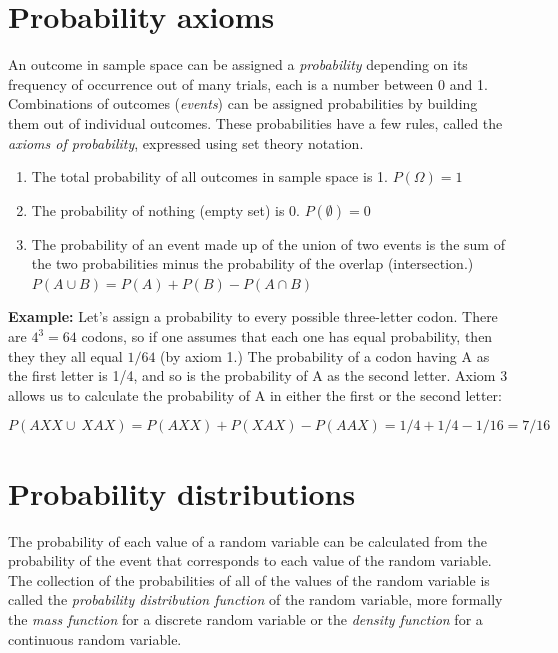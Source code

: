 \documentclass[
  letterpaper,
  DIV=11,
  numbers=noendperiod]{scrreprt}
\begin{document}
\hypertarget{probability-axioms}{%
\section{Probability axioms}\label{probability-axioms}}

An outcome in sample space can be assigned a \emph{probability}
depending on its frequency of occurrence out of many trials, each is a
number between 0 and 1. Combinations of outcomes (\emph{events}) can be
assigned probabilities by building them out of individual outcomes.
These probabilities have a few rules, called the \emph{axioms of
probability}, expressed using set theory notation.

\begin{enumerate}
\def\labelenumi{\arabic{enumi}.}
\item
  The total probability of all outcomes in sample space is 1.
  \(P(\Omega) = 1\)
\item
  The probability of nothing (empty set) is 0. \(P(\emptyset) = 0\)
\item
  The probability of an event made up of the union of two events is the
  sum of the two probabilities minus the probability of the overlap
  (intersection.) \(P(A \cup B) = P(A) + P(B) - P(A \cap B)\)
\end{enumerate}

\textbf{Example:} Let's assign a probability to every possible
three-letter codon. There are \(4^3 = 64\) codons, so if one assumes
that each one has equal probability, then they they all equal \(1/64\)
(by axiom 1.) The probability of a codon having A as the first letter is
1/4, and so is the probability of A as the second letter. Axiom 3 allows
us to calculate the probability of A in either the first or the second
letter:

\[ P(AXX \cup \ XAX ) =  P(AXX) + P(XAX) - P(AAX) = 1/4 + 1/4 - 1/16 = 7/16\]

\hypertarget{probability-distributions}{%
\section{Probability distributions}\label{probability-distributions}}

The probability of each value of a random variable can be calculated
from the probability of the event that corresponds to each value of the
random variable. The collection of the probabilities of all of the
values of the random variable is called the \emph{probability
distribution function} of the random variable, more formally the
\emph{mass function} for a discrete random variable or the \emph{density
function} for a continuous random variable.
\end{document}
